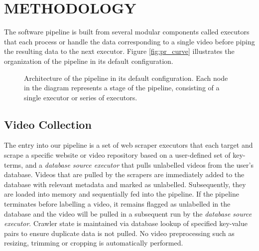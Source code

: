 \documentclass[letterpaper, 10 pt, conference]{ieeeconf}
\begin{document}
\section{METHODOLOGY}

The software pipeline is built from several modular components called executors that each process or handle the data corresponding to a single video before piping the resulting data to the next executor. Figure \ref{fig:pr_curve} illustrates the organization of the pipeline in its default configuration.

\begin{figure}[htbp]
	\centering
		\caption{Architecture of the pipeline in its default configuration. Each node in the diagram represents a stage of the pipeline, consisting of a single executor or series of executors.}
		\label{fig:pipeline-architecture}
\end{figure}

\subsection{Video Collection}

The entry into our pipeline is a set of web scraper executors that each target and scrape a specific website or video repository based on a user-defined set of key-terms, and a \textit{database source executor} that pulls unlabelled videos from the user's database. Videos that are pulled by the scrapers are immediately added to the database with relevant metadata and marked as unlabelled. Subsequently, they are loaded into memory and sequentially fed into the pipeline. If the pipeline terminates before labelling a video, it remains flagged as unlabelled in the database and the video will be pulled in a subsequent run by the \textit{database source executor}. Crawler state is maintained via database lookup of specified key-value pairs to ensure duplicate data is not pulled. No video preprocessing such as resizing, trimming or cropping is automatically performed.
\end{document}
